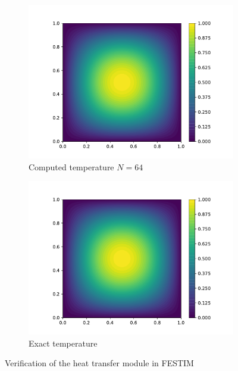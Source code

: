 \begin{figure}
    \centering
    \begin{subfigure}{0.5\linewidth}
        \centering
        \includegraphics[width=\linewidth]{Figures/Chapter2/T.pdf}
        \caption{Computed temperature $N=64$}
    \end{subfigure}%
    \begin{subfigure}{0.5\linewidth}
        \centering
        \includegraphics[width=\linewidth]{Figures/Chapter2/T_exact.pdf}
        \caption{Exact temperature}
    \end{subfigure}

    \caption{Verification of the heat transfer module in FESTIM}
    \label{fig: results MMS heat transfer}
\end{figure}


